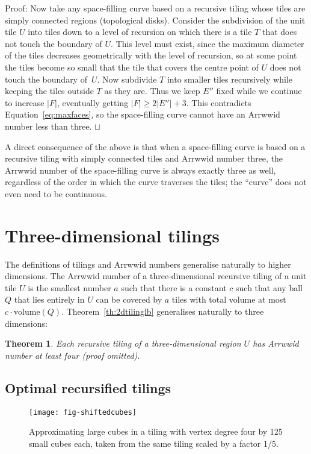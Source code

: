 \documentclass[11pt,a4paper]{article}
\newcommand{\vol}{\mathrm{volume}}
\newcommand{\unittile}{\ensuremath{U}\xspace}
\newtheorem{theorem}{Theorem}
\newenvironment{proof}{Proof:}{\qed}
\def\squareforqed{\hbox{\rlap{$\sqcap$}$\sqcup$}}
\def\qed{\ifmmode\squareforqed\else{\unskip\nobreak\hfil
\penalty50\hskip1em\null\nobreak\hfil\squareforqed
\parfillskip=0pt\finalhyphendemerits=0\endgraf}\fi}
\begin{document}
\begin{proof}
Now take any space-filling curve based on a recursive tiling whose tiles are simply connected regions (topological disks). Consider the subdivision of the unit tile \unittile into tiles down to a level of recursion on which there is a tile $T$ that does not touch the boundary of \unittile. This level must exist, since the maximum diameter of the tiles decreases geometrically with the level of recursion, so at some point the tiles become so small that the tile that covers the centre point of \unittile does not touch the boundary of~\unittile. Now subdivide $T$ into smaller tiles recursively while keeping the tiles outside $T$ as they are. Thus we keep $E''$ fixed while we continue to increase $|F|$, eventually getting $|F| \geq 2|E''| + 3$. This contradicts Equation~\ref{eq:maxfaces}, so the space-filling curve cannot have an Arrwwid number less than three.
\end{proof}

A direct consequence of the above is that when a space-filling curve is based on a recursive tiling with simply connected tiles and Arrwwid number three, the Arrwwid number of the space-filling curve is always exactly three as well, regardless of the order in which the curve traverses the tiles; the ``curve'' does not even need to be continuous.

\section{Three-dimensional tilings}
The definitions of tilings and Arrwwid numbers generalise naturally to higher dimensions. The Arrwwid number of a three-dimensional recursive tiling of a unit tile \unittile is the smallest number $a$ such that there is a constant $c$ such that any ball $Q$ that lies entirely in \unittile can be covered by $a$ tiles with total volume at most $c \cdot \vol(Q)$. Theorem~\ref{th:2dtilinglb} generalises naturally to three dimensions:
\begin{theorem}\label{th:3dtilinglb}
Each recursive tiling of a three-dimensional region \unittile has Arrwwid number at least four
(proof omitted).
\end{theorem}

\subsection{Optimal recursified tilings}\label{sec:3drecursified}

\begin{figure}
\centering
\texttt{[image: fig-shiftedcubes]}
\caption{Approximating large cubes in a tiling with vertex degree four by 125 small cubes each, taken from the same tiling scaled by a factor 1/5.}
\label{fig:shiftedcubes}
\end{figure}
\end{document}
